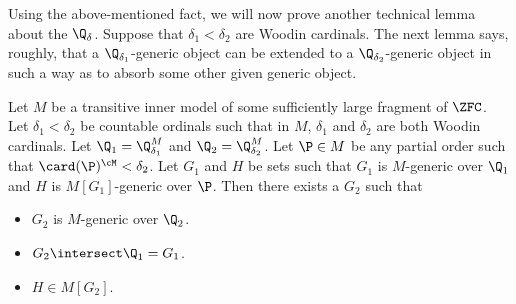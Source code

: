 Using the above-mentioned fact, we will now prove another
 technical lemma about the $\Q_{\delta}$. Suppose that
$\delta_1<\delta_2$ are Woodin cardinals. The next lemma says, roughly,
that a $\Q_{\delta_1}$-generic object can be extended to a
$\Q_{\delta_2}$-generic object in such a way as to absorb some other
given generic object.

\begin{lemma}
\label{Extend_Stat_Tower_Filter}
Let $M$ be a transitive inner model of some sufficiently large fragment
of $\ZFC$. Let $\delta_1<\delta_2$ be countable ordinals such that
in $M$,  $\delta_1$ and $\delta_2$ are both Woodin cardinals.
Let $\Q_1=\Q_{\delta_1}^{M}$ and  $\Q_2=\Q_{\delta_2}^{M}$.
Let $\P\in M$  be any partial order such that $\card(\P)^{\cM}<\delta_2$.
Let $G_1$ and $H$ be sets such that $G_1$ is $M$-generic over $\Q_1$
and $H$ is $M[G_1]$-generic over $\P$. Then there exists a $G_2$ such that
\begin{itemize}
\item $G_2$ is $M$-generic over $\Q_2$.
\item $G_2\intersect\Q_1=G_1$.
\item $H\in M[G_2]$.
\end{itemize}
\end{lemma}
